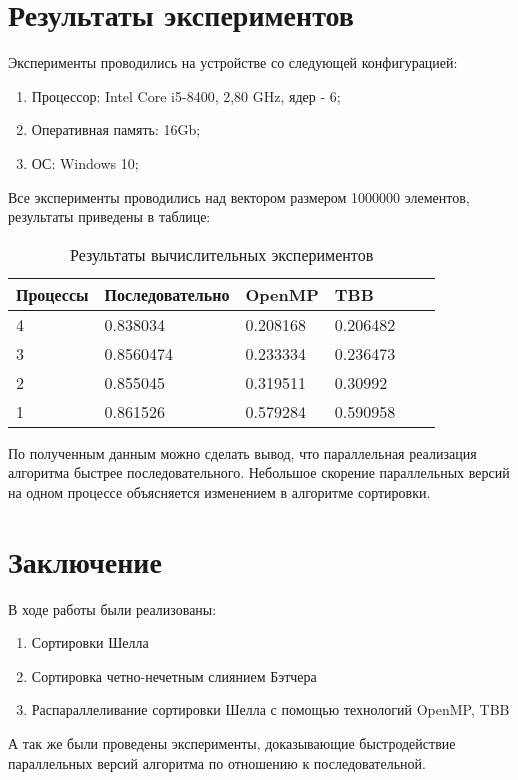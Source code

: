 \documentclass{report}
\begin{document}
\newpage


\section*{Результаты экспериментов}
Эксперименты проводились на устройстве со следующей конфигурацией:
\begin{enumerate}
\item Процессор: Intel Core i5-8400, 2,80 GHz, ядер - 6;
\item Оперативная память:  16Gb;
\item ОС: Windows 10;
\end{enumerate}
Все эксперименты проводились над вектором размером 1000000 элементов, результаты приведены в таблице:

\begin{table}[!h]
\caption{Результаты вычислительных экспериментов}
\centering
\begin{tabular}{ | l | l | l | l  | l | l | }
\hline
Процессы  & Последовательно & OpenMP & TBB  \\ \hline
4  & 0.838034 & 0.208168 &  0.206482 \\ \hline
3  & 0.8560474 & 0.233334 &  0.236473 \\ \hline
2  & 0.855045 & 0.319511 &  0.30992 \\ \hline
1  & 0.861526 & 0.579284 &  0.590958  \\ \hline
\end{tabular}
\end{table}

\par По полученным данным можно сделать вывод, что параллельная реализация алгоритма быстрее последовательного. Небольшое скорение параллельных версий на одном процессе объясняется изменением в алгоритме сортировки.

\newpage
\section*{Заключение}
\par В ходе работы были реализованы:
\begin{enumerate}
\item Сортировки Шелла
\item Сортировка четно-нечетным слиянием Бэтчера
\item Распараллеливание сортировки Шелла с помощью технологий OpenMP, TBB
\end{enumerate}
\par А так же были проведены эксперименты, доказывающие быстродействие параллельных версий алгоритма по отношению к последовательной.
\newpage
\end{document}
